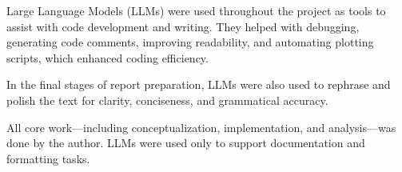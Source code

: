 \documentclass{article}
\begin{document}
Large Language Models (LLMs) were used throughout the project as tools to assist with code development and writing. They helped with debugging, generating code comments, improving readability, and automating plotting scripts, which enhanced coding efficiency. 

In the final stages of report preparation, LLMs were also used to rephrase and polish the text for clarity, conciseness, and grammatical accuracy. 

All core work—including conceptualization, implementation, and analysis—was done by the author. LLMs were used only to support documentation and formatting tasks.


\end{document}

